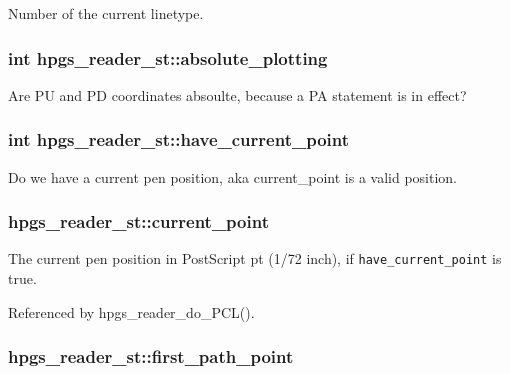 Number of the current linetype. 
\subsubsection[absolute\_\-plotting]{\setlength{\rightskip}{0pt plus 5cm}int {\bf hpgs\_\-reader\_\-st::absolute\_\-plotting}}\label{structhpgs__reader__st_04d6a37e1e9b04a801fb9b6e55663f8c}


Are PU and PD coordinates absoulte, because a PA statement is in effect? 
\subsubsection[have\_\-current\_\-point]{\setlength{\rightskip}{0pt plus 5cm}int {\bf hpgs\_\-reader\_\-st::have\_\-current\_\-point}}\label{structhpgs__reader__st_e622c0decb815832f931ab8f707c0b63}


Do we have a current pen position, aka current\_\-point is a valid position. 
\subsubsection[current\_\-point]{ {\bf hpgs\_\-reader\_\-st::current\_\-point}}\label{structhpgs__reader__st_5742512be1ab22bb26247c309cfac95e}


The current pen position in PostScript pt (1/72 inch), if {\tt have\_\-current\_\-point} is true. 

Referenced by hpgs\_\-reader\_\-do\_\-PCL().
\subsubsection[first\_\-path\_\-point]{ {\bf hpgs\_\-reader\_\-st::first\_\-path\_\-point}}\label{structhpgs__reader__st_e2dd059b9b389ea689fbfb0b7229c837}



